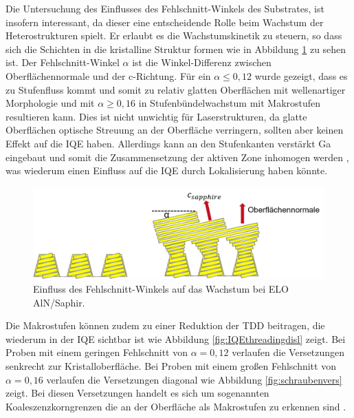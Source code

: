 Die Untersuchung des Einflusses des Fehlschnitt-Winkels des Substrates, ist insofern interessant, da dieser eine entscheidende Rolle beim Wachstum der Heterostrukturen spielt. Er erlaubt es die Wachstumskinetik zu steuern, so dass sich die Schichten in die kristalline Struktur formen wie in Abbildung \ref{fig:offcut} zu sehen ist.
Der Fehlschnitt-Winkel $\alpha$ ist die Winkel-Differenz zwischen Oberflächennormale und der c-Richtung. Für ein $\alpha \leq 0,12 $ wurde gezeigt, dass es zu Stufenfluss kommt und somit zu relativ glatten Oberflächen mit wellenartiger Morphologie und mit $\alpha \geq 0,16 $ in Stufenbündelwachstum mit Makrostufen resultieren kann. Dies ist nicht unwichtig für Laserstrukturen, da glatte Oberflächen optische Streuung an der Oberfläche verringern, sollten aber keinen Effekt auf die IQE haben. Allerdings kann an den Stufenkanten verstärkt Ga eingebaut und somit die Zusammensetzung der aktiven Zone inhomogen werden \cite{zeimeru} \cite{MOGILATENKO2014222} \cite{fmehnke}, was wiederum einen Einfluss auf die IQE durch Lokalisierung haben könnte.
%
\begin{figure}[htb]
\includegraphics[width=\linewidth]{Bilder/offcut.png}
\caption{Einfluss des Fehlschnitt-Winkels auf das Wachstum bei ELO AlN/Saphir.}
\label{fig:offcut}
\end{figure}
\noindent 
%
Die Makrostufen können zudem zu einer Reduktion der TDD beitragen, die wiederum in der IQE sichtbar ist wie Abbildung \ref{fig:IQEthreadingdisl} zeigt. Bei Proben mit einem geringen Fehlschnitt von $\alpha = 0,12 $ verlaufen die Versetzungen senkrecht zur Kristalloberfläche. Bei Proben mit einem großen Fehlschnitt von $\alpha = 0,16 $ verlaufen die Versetzungen diagonal wie Abbildung \ref{fig:schraubenvers} zeigt. Bei diesen Versetzungen handelt es sich um sogenannten Koaleszenzkorngrenzen die an der Oberfläche als Makrostufen zu erkennen sind \cite{MOGILATENKO2014222}. 
%
